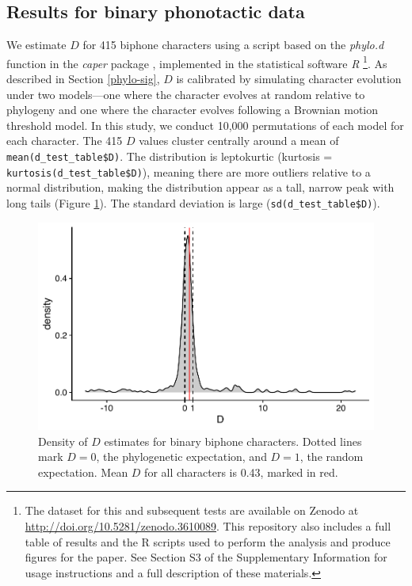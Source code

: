\hypertarget{phy-sig-bin-results}{%
\subsection{Results for binary phonotactic data}\label{phy-sig-bin-results}}

We estimate \(D\) for 415 biphone characters using a script based on the \emph{phylo.d} function in the \emph{caper} package \autocite{orme_caper:_2013}, implemented in the statistical software \emph{R} \autocite{r_core_team_r:_2017}\footnote{The dataset for this and subsequent tests are available on Zenodo at \url{http://doi.org/10.5281/zenodo.3610089}. This repository also includes a full table of results and the R scripts used to perform the analysis and produce figures for the paper. See Section S3 of the Supplementary Information for usage instructions and a full description of these materials.}. As described in Section \ref{phylo-sig}, \(D\) is calibrated by simulating character evolution under two models---one where the character evolves at random relative to phylogeny and one where the character evolves following a Brownian motion threshold model. In this study, we conduct 10,000 permutations of each model for each character. The 415 \(D\) values cluster centrally around a mean of \texttt{mean(d\_test\_table\$D)}. The distribution is leptokurtic (kurtosis = \texttt{kurtosis(d\_test\_table\$D)}), meaning there are more outliers relative to a normal distribution, making the distribution appear as a tall, narrow peak with long tails (Figure \ref{fig:d-density}). The standard deviation is large (\texttt{sd(d\_test\_table\$D)}).

\begin{figure}

{\centering \includegraphics[width=0.66\linewidth]{05-phylo-signal/fig/d-density} 

}

\caption{Density of $D$ estimates for binary biphone characters. Dotted lines mark $D=0$, the phylogenetic expectation, and $D=1$, the random expectation. Mean $D$ for all characters is 0.43, marked in red.}\label{fig:d-density}
\end{figure}

